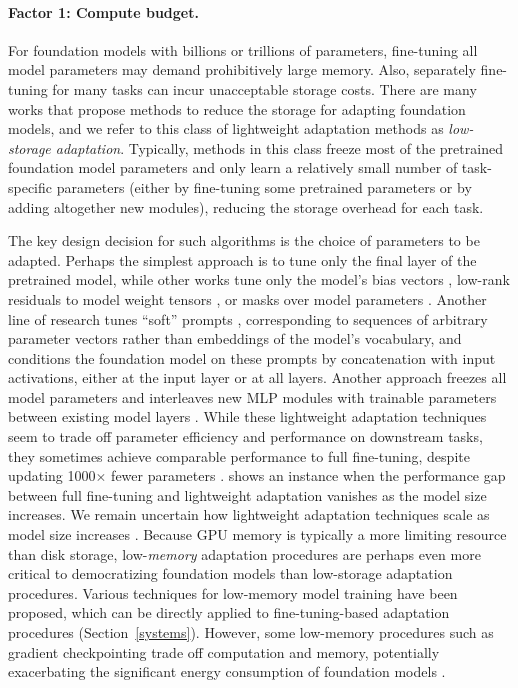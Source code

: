 \paragraph{Factor 1: Compute budget.} For foundation models with billions or trillions of parameters, fine-tuning all model parameters may demand prohibitively large memory. Also, separately fine-tuning for many tasks can incur unacceptable storage costs. There are many works that propose methods to reduce the storage for adapting foundation models, and we refer to this class of lightweight adaptation methods as \textit{low-storage adaptation}. Typically, methods in this class freeze most of the pretrained foundation model parameters and only learn a relatively small number of task-specific parameters (either by fine-tuning some pretrained parameters or by adding altogether new modules), reducing the storage overhead for each task.

The key design decision for such algorithms is the choice of parameters to be adapted. Perhaps the simplest approach is to tune only the final layer of the pretrained model, while other works tune only the model's bias vectors \citep{zaken2021bitfit}, low-rank residuals to model weight tensors \citep{hu2021lora}, or masks over model parameters \citep{zhao2020masking}. Another line of research tunes ``soft'' prompts \citep{li2021prefix,qin-eisner-2021,liu2021prompt, lester2021power,hambardzumyan-etal-2021-warp}, corresponding to sequences of arbitrary parameter vectors rather than embeddings of the model's vocabulary, and conditions the foundation model on these prompts by concatenation with input activations, either at the input layer or at all layers. Another approach freezes all model parameters and interleaves new MLP modules with trainable parameters between existing model layers \citep{houlsby19adapter}. While these lightweight adaptation techniques seem to trade off parameter efficiency and performance on downstream tasks, they sometimes achieve comparable performance to full fine-tuning, despite updating 1000$\times$ fewer parameters \citep{zaken2021bitfit,li2021prefix,hu2021lora}. \citet{lester2021power} shows an instance when the performance gap between full fine-tuning and lightweight adaptation vanishes as the model size increases. We remain uncertain how lightweight adaptation techniques scale as model size increases \citep{aghajanyan2020intrinsic}. Because GPU memory is typically a more limiting resource than disk storage, low-\textit{memory} adaptation procedures are perhaps even more critical to democratizing foundation models than low-storage adaptation procedures. Various techniques for low-memory model training have been proposed, which can be directly applied to fine-tuning-based adaptation procedures (Section~\ref{systems}). However, some low-memory procedures such as gradient checkpointing \cite{gradient-checkpointing} trade off computation and memory, potentially exacerbating the significant energy consumption of foundation models \cite{bender2021}.

